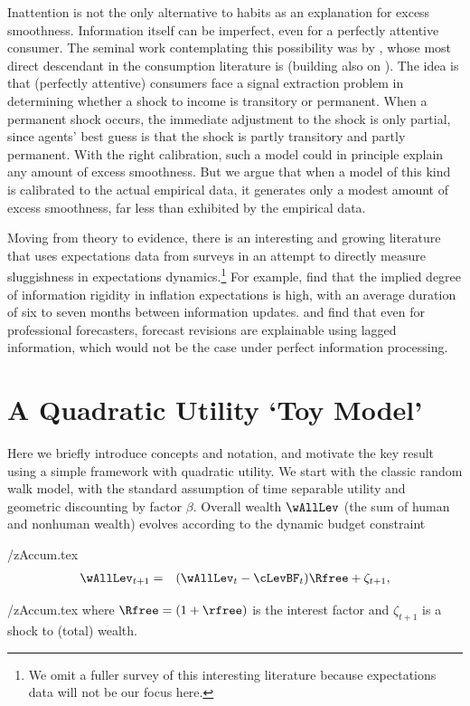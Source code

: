 \documentclass[titlepage]{\econtex}\newcommand{\texname}{cAndCwithStickyE}
\begin{document}
Inattention is not the only alternative to habits as an explanation for excess smoothness.  Information itself can be imperfect, even for a perfectly attentive consumer.  The seminal work contemplating this possibility was by \cite{muthOptimal}, whose most direct descendant in the consumption literature is \cite{pischkeMicroMacro} (building also on \cite{lucas:imperfectInfo}).  The idea is that (perfectly attentive) consumers face a signal extraction problem in determining whether a shock to income is transitory or permanent.  When a permanent shock occurs, the immediate adjustment to the shock is only partial, since agents' best guess is that the shock is partly transitory and partly permanent.   With the right calibration, such a model could in principle explain any amount of excess smoothness.  But we argue that when a model of this kind is calibrated to the actual empirical data, it generates only a modest amount of excess smoothness, far less than exhibited by the empirical data.

Moving from theory to evidence, there is an interesting and growing literature that uses expectations data from surveys in an attempt to directly measure sluggishness in expectations dynamics.\footnote{We omit a fuller survey of this interesting literature because expectations data will not be our focus here.} For example, \cite{coibGor:AER15} find that the implied degree of information rigidity in inflation expectations is high, with an average duration of six to seven months between information updates. \cite{fuhrer:JME17} and \cite{fuhrer:IntrinsicPersistence} find that even for professional forecasters, forecast revisions are explainable using lagged information, which would not be the case under perfect information processing.



\section{A Quadratic Utility `Toy Model'}\label{sec:Quadratic}

Here we briefly introduce concepts and notation, and motivate the key result using a simple framework with quadratic utility.  We start with the classic \cite{hallRandomWalk} random walk model, with the standard assumption of time separable utility and geometric discounting by factor $\beta$.  Overall wealth $\wAllLev$ (the sum of human and nonhuman wealth) evolves according to the dynamic budget constraint
\begin{verbatimwrite}{\eq/zAccum.tex}
\begin{eqnarray}
  \wAllLev_{t+1} & = & (\wAllLev_{t}-\cLevBF_{t})\Rfree+\zeta_{t+1}, \label{eq:zAccum}
\end{eqnarray}
\end{verbatimwrite}
 \eq/zAccum.tex
where $\Rfree=(1+\rfree)$ is the interest factor and $\zeta_{t+1}$ is a shock to (total) wealth.
\end{document}
